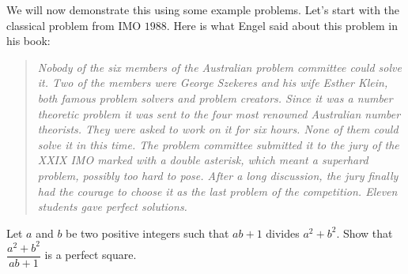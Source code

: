 \documentclass{subfile}
\begin{document}
	We will now demonstrate this using some example problems. Let's start with the classical problem from IMO $1988$. Here is what Engel said about this problem in his book:
		\begin{quote}\slshape
			Nobody of the six members of the Australian problem committee could solve it. Two of the members were George Szekeres and his wife Esther Klein, both famous problem solvers and problem creators. Since it was a number theoretic problem it was sent to the four most renowned Australian number theorists. They were asked to work on it for six hours. None of them could solve it in this time. The problem committee submitted it to the jury of the XXIX IMO marked with a double asterisk, which meant a superhard problem, possibly too hard to pose. After a long discussion, the jury finally had the courage to choose it as the last problem of the competition. Eleven students gave perfect solutions.
		\end{quote}
	
	\begin{problem}
		Let $ a$ and $ b$ be two positive integers such that $ab + 1$ divides $ a^{2} + b^{2}$. Show that $\dfrac{a^{2}+b^{2}}{ab+1}$ is a perfect square.
	\end{problem}
	
\end{document}
